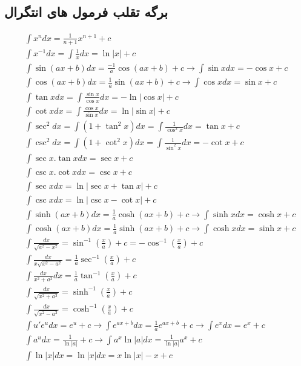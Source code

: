 \newpage
\subsection{برگه تقلب فرمول های انتگرال}
\begin{align*}
&\int x^n dx = \frac{1}{n+1}x^{n+1}+c \\
&\int x^{-1} dx = \int \frac{1}{x} dx = \ln|x|+c \\
&\int \sin (ax+b) dx = \frac{-1}{a} \cos(ax+b)+c \to \int \sin x dx = -\cos x+c \\
&\int \cos (ax+b) dx = \frac{1}{a} \sin(ax+b)+c  \to \int \cos x dx = \sin x+c \\
&\int \tan x dx = \int \frac{\sin x}{\cos x} dx = -\ln|\cos x|+c \\
&\int \cot x dx = \int \frac{\cos x}{\sin x} dx = \ln|\sin x|+c \\
&\int \sec^2 dx = \int (1+\tan^2 x) dx = \int \frac{1}{\cos^2 x} dx = \tan x + c \\
&\int \csc^2 dx = \int (1+\cot^2 x) dx = \int \frac{1}{\sin^2 x} dx = -\cot x + c \\
&\int \sec x.\tan x dx = \sec x + c \\
&\int \csc x.\cot x dx = \csc x + c \\
&\int \sec x dx = \ln|\sec x+\tan x|+c \\
&\int \csc x dx = \ln|\csc x-\cot x|+c \\
&\int \sinh (ax+b) dx = \frac{1}{a} \cosh (ax+b) + c \to \int \sinh x dx = \cosh x + c \\
&\int \cosh (ax+b) dx = \frac{1}{a} \sinh (ax+b) + c \to \int \cosh x dx = \sinh x + c \\
&\int \frac{dx}{\sqrt{a^2-x^2}} = \sin^{-1} (\frac{x}{a}) + c = -\cos^{-1} (\frac{x}{a}) + c \\
&\int \frac{dx}{x\sqrt{x^2-a^2}} = \frac{1}{a} \sec^{-1} (\frac{x}{a}) + c \\
&\int \frac{dx}{x^2+a^2} dx = \frac{1}{a} \tan^{-1} (\frac{x}{a}) + c \\
&\int \frac{dx}{\sqrt{x^2+a^2}} = \sinh^{-1} (\frac{x}{a}) + c \\
&\int \frac{dx}{\sqrt{x^2-a^2}} = \cosh^{-1} (\frac{x}{a}) + c \\
&\int u'e^u dx = e^u + c \to \int e^{ax+b} dx = \frac{1}{a} e^{ax+b} + c \to \int e^x dx = e^x + c \\
&\int a^u dx = \frac{1}{\ln|a|} + c \to \int a^x \ln|a| dx = \frac{1}{\ln|a|} a^x + c  \\
&\int \ln|x| dx = \ln|x| dx = x\ln|x| - x + c \\
\end{align*}